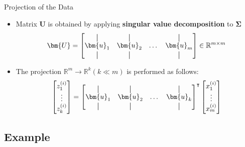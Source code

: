 \begin{frame}{Projection of the Data}{}
	\begin{itemize}
		\item Matrix $\bm{U}$ is obtained by applying \textbf{singular value decomposition} to $\bm{\Sigma}$
		\begin{equation}
			\bm{U} =
			\begin{bmatrix}
				\vertbar 		& \vertbar 		& 		& \vertbar 			\\
				\bm{u}_1 		& \bm{u}_2 	& \dots 	& \bm{u}_m		\\
				\vertbar 		& \vertbar 		& 		& \vertbar
			\end{bmatrix} \in \mathbb{R}^{m \times m}
		\end{equation}
		\item The projection $\mathbb{R}^m \rightarrow \mathbb{R}^k (k \ll m)$ is performed as follows:
		\begin{equation}
			\begin{bmatrix}
				z_1^{(i)} 	\\
				\vdots 	\\
				z_k^{(i)}
			\end{bmatrix} = 
			\begin{bmatrix}
				\vertbar 		& \vertbar 		& 		& \vertbar 			\\
				\bm{u}_1 		& \bm{u}_2 	& \dots 	& \bm{u}_k		\\
				\vertbar 		& \vertbar 		& 		& \vertbar
			\end{bmatrix}^{\intercal}
			\begin{bmatrix}
				x_1^{(i)} 	\\
				\vdots 	\\
				x_m^{(i)}
			\end{bmatrix}
		\end{equation}
	\end{itemize}
\end{frame}


\subsection{Example}

